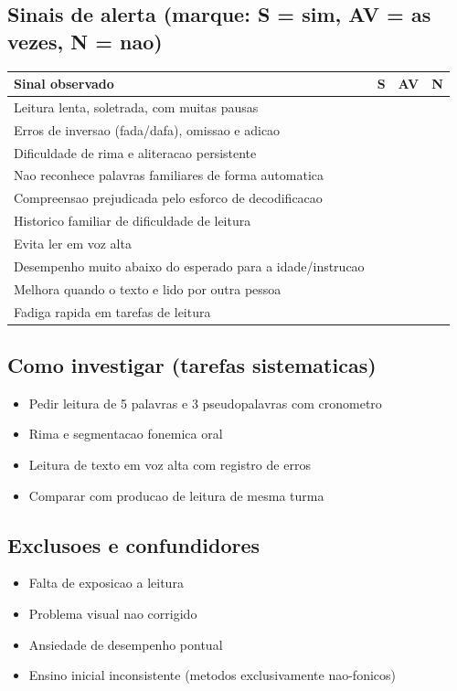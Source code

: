 \documentclass[a4paper,11pt]{book}
\begin{document}
\subsection*{Sinais de alerta (marque: S = sim, AV = as vezes, N = nao)}
\begin{tabular}{@{}p{11.5cm}ccc@{}}\toprule
Sinal observado & S & AV & N \\\midrule
Leitura lenta, soletrada, com muitas pausas & & & \\
Erros de inversao (fada/dafa), omissao e adicao & & & \\
Dificuldade de rima e aliteracao persistente & & & \\
Nao reconhece palavras familiares de forma automatica & & & \\
Compreensao prejudicada pelo esforco de decodificacao & & & \\
Historico familiar de dificuldade de leitura & & & \\
Evita ler em voz alta & & & \\
Desempenho muito abaixo do esperado para a idade/instrucao & & & \\
Melhora quando o texto e lido por outra pessoa & & & \\
Fadiga rapida em tarefas de leitura & & & \\
\bottomrule\end{tabular}
\subsection*{Como investigar (tarefas sistematicas)}
\begin{itemize}
\item Pedir leitura de 5 palavras e 3 pseudopalavras com cronometro
\item Rima e segmentacao fonemica oral
\item Leitura de texto em voz alta com registro de erros
\item Comparar com producao de leitura de mesma turma
\end{itemize}
\subsection*{Exclusoes e confundidores}
\begin{itemize}
\item Falta de exposicao a leitura
\item Problema visual nao corrigido
\item Ansiedade de desempenho pontual
\item Ensino inicial inconsistente (metodos exclusivamente nao-fonicos)
\end{itemize}
\end{document}
